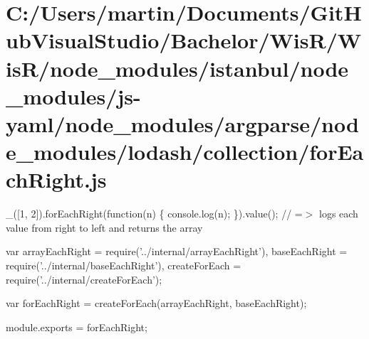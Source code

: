 \hypertarget{_c_1_2_users_2martin_2_documents_2_git_hub_visual_studio_2_bachelor_2_wis_r_2_wis_r_2node_moduleaddd0de1ccce20620392b6f4399bbb98}{}\section{C\+:/\+Users/martin/\+Documents/\+Git\+Hub\+Visual\+Studio/\+Bachelor/\+Wis\+R/\+Wis\+R/node\+\_\+modules/istanbul/node\+\_\+modules/js-\/yaml/node\+\_\+modules/argparse/node\+\_\+modules/lodash/collection/for\+Each\+Right.\+js}
\+\_\+(\mbox{[}1, 2\mbox{]}).for\+Each\+Right(function(n) \{ console.\+log(n); \}).value(); // =$>$ logs each value from right to left and returns the array


\begin{DoxyCodeInclude}
var arrayEachRight = require(\textcolor{stringliteral}{'../internal/arrayEachRight'}),
    baseEachRight = require(\textcolor{stringliteral}{'../internal/baseEachRight'}),
    createForEach = require(\textcolor{stringliteral}{'../internal/createForEach'});

var forEachRight = createForEach(arrayEachRight, baseEachRight);

module.exports = forEachRight;
\end{DoxyCodeInclude}
 